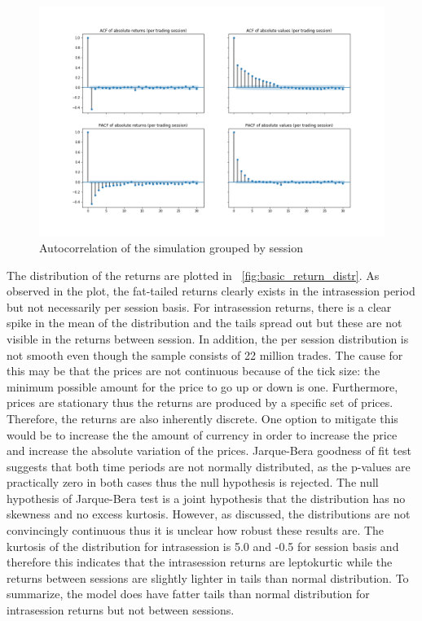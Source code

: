 \begin{figure}
    \includegraphics[width=\linewidth]{plots/basic_autocorrelation.png}
    \caption{Autocorrelation of the simulation grouped by session}
    \label{fig:basic_autocorr_per_session}
\end{figure}


The distribution of the returns are plotted in ~\ref{fig:basic_return_distr}. As observed in the plot, the fat-tailed returns
clearly exists in the intrasession period but not necessarily per session basis. For intrasession returns, there is a clear spike in the mean of the 
distribution and the tails spread out but these are not visible in the returns between session. In addition, the per session distribution
is not smooth even though the sample consists of 22 million trades. The cause for this may be that the prices are not 
continuous because of the tick size: the minimum possible amount for the price to go up or down is one. Furthermore, prices are
stationary thus the returns are produced by a specific set of prices. Therefore, the returns are also inherently discrete. One option
to mitigate this would be to increase the the amount of currency in order to increase the price and increase the absolute
variation of the prices. Jarque-Bera goodness of fit test suggests that both time periods are not normally distributed, %
as the p-values are practically zero in both cases thus the null hypothesis is rejected. The null hypothesis of Jarque-Bera test 
is a joint hypothesis that the distribution has no skewness and no excess kurtosis. However, as discussed, the distributions are not 
convincingly continuous thus it is unclear how robust these results are. The kurtosis of the distribution for intrasession is 5.0 
and -0.5 for session basis and therefore this indicates that the intrasession returns are leptokurtic while the returns between 
sessions are slightly lighter in tails than normal distribution. To summarize, the model does have fatter tails than normal distribution
for intrasession returns but not between sessions. 

